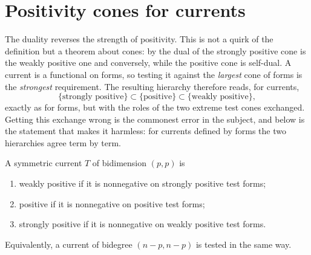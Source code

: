 \section{Positivity cones for currents}
\label{sec:ch14-positivity}

The duality reverses the strength of positivity.  This is not a quirk of the
definition but a theorem about cones: by
 the dual of the strongly positive cone is
the weakly positive one and conversely, while the positive cone is
self-dual.  A current is a functional on forms, so testing it against the
\emph{largest} cone of forms is the \emph{strongest} requirement.  The
resulting hierarchy therefore reads, for currents,
\[
 \{\text{strongly positive}\}\subset\{\text{positive}\}
   \subset\{\text{weakly positive}\},
\]
exactly as for forms, but with the roles of the two extreme test cones
exchanged.  Getting this exchange wrong is the commonest error in the
subject, and  below is the statement that
makes it harmless: for currents defined by forms the two hierarchies agree
term by term.

\begin{definition}
\label{def:ch14-current-positivity}
A symmetric current $T$ of bidimension $(p,p)$ is
\begin{enumerate}
\item weakly positive if it is nonnegative on strongly positive test forms;
\item positive if it is nonnegative on positive test forms;
\item strongly positive if it is nonnegative on weakly positive test forms.
\end{enumerate}
Equivalently, a current of bidegree $(n-p,n-p)$ is tested in the same way.
\end{definition}

